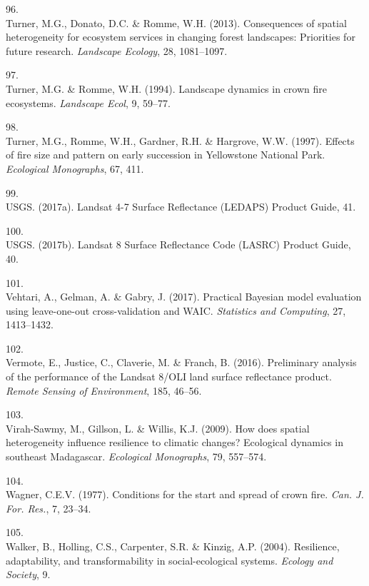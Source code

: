 \documentclass[]{article}
\begin{document}
\leavevmode\hypertarget{ref-turner2013}{}%
96.\\
Turner, M.G., Donato, D.C. \& Romme, W.H. (2013). Consequences of
spatial heterogeneity for ecosystem services in changing forest
landscapes: Priorities for future research. \emph{Landscape Ecology},
28, 1081--1097.

\leavevmode\hypertarget{ref-turner1994a}{}%
97.\\
Turner, M.G. \& Romme, W.H. (1994). Landscape dynamics in crown fire
ecosystems. \emph{Landscape Ecol}, 9, 59--77.

\leavevmode\hypertarget{ref-turner1997}{}%
98.\\
Turner, M.G., Romme, W.H., Gardner, R.H. \& Hargrove, W.W. (1997).
Effects of fire size and pattern on early succession in Yellowstone
National Park. \emph{Ecological Monographs}, 67, 411.

\leavevmode\hypertarget{ref-usgs2017}{}%
99.\\
USGS. (2017a). Landsat 4-7 Surface Reflectance (LEDAPS) Product Guide,
41.

\leavevmode\hypertarget{ref-usgs2017a}{}%
100.\\
USGS. (2017b). Landsat 8 Surface Reflectance Code (LASRC) Product Guide,
40.

\leavevmode\hypertarget{ref-vehtari2017}{}%
101.\\
Vehtari, A., Gelman, A. \& Gabry, J. (2017). Practical Bayesian model
evaluation using leave-one-out cross-validation and WAIC.
\emph{Statistics and Computing}, 27, 1413--1432.

\leavevmode\hypertarget{ref-vermote2016}{}%
102.\\
Vermote, E., Justice, C., Claverie, M. \& Franch, B. (2016). Preliminary
analysis of the performance of the Landsat 8/OLI land surface
reflectance product. \emph{Remote Sensing of Environment}, 185, 46--56.

\leavevmode\hypertarget{ref-virah-sawmy2009}{}%
103.\\
Virah-Sawmy, M., Gillson, L. \& Willis, K.J. (2009). How does spatial
heterogeneity influence resilience to climatic changes? Ecological
dynamics in southeast Madagascar. \emph{Ecological Monographs}, 79,
557--574.

\leavevmode\hypertarget{ref-wagner1977}{}%
104.\\
Wagner, C.E.V. (1977). Conditions for the start and spread of crown
fire. \emph{Can. J. For. Res.}, 7, 23--34.

\leavevmode\hypertarget{ref-walker2004}{}%
105.\\
Walker, B., Holling, C.S., Carpenter, S.R. \& Kinzig, A.P. (2004).
Resilience, adaptability, and transformability in social-ecological
systems. \emph{Ecology and Society}, 9.
\end{document}
